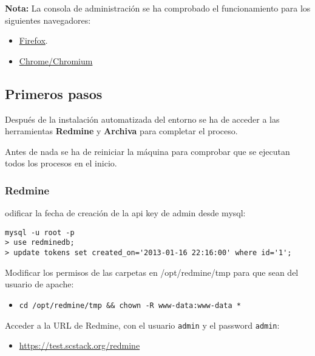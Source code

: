 \par \textbf{Nota:} La consola de administración se ha comprobado el funcionamiento para los siguientes navegadores:

\begin{itemize}
	\item \href{http://www.mozilla.org/es-ES/firefox/new/}{Firefox}.
	\item \href{https://www.google.com/intl/es/chrome/browser/?hl=es}{Chrome/Chromium}

\end{itemize}

\subsection{Primeros pasos}
\label{sub:primeros-pasos}

\par Después de la instalación automatizada del entorno se ha de acceder a las herramientas \textbf{Redmine} y \textbf{Archiva} para completar el proceso.

\par Antes de nada se ha de reiniciar la máquina para comprobar que se ejecutan todos los procesos en el inicio.

\subsubsection{Redmine}
\label{subs:conf-redmine}

\par odificar la fecha de creación de la api key de admin desde mysql:

\lstset{style=rubybasico}
\begin{lstlisting}[frame=trbl]
mysql -u root -p
> use redminedb;
> update tokens set created_on='2013-01-16 22:16:00' where id='1';
\end{lstlisting}

\par Modificar los permisos de las carpetas en /opt/redmine/tmp para que sean del usuario de apache:

\begin{itemize}
\item
  \texttt{cd /opt/redmine/tmp \&\& chown -R www-data:www-data *}
\end{itemize}
Acceder a la URL de Redmine, con el usuario \texttt{admin} y el password
\texttt{admin}:

\begin{itemize}
\item \href{https://test.scstack.org/redmine}{https://test.scstack.org/redmine}
\end{itemize}


